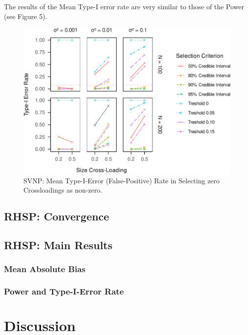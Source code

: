 \documentclass[
  man, donotrepeattitle,floatsintext]{apa6}
\begin{document}
The results of the Mean Type-I error rate are very similar to those of the Power (see Figure 5).

\begin{figure}
\centering
\includegraphics{JMBKoch_thesis_files/figure-latex/unnamed-chunk-5-1.pdf}
\caption{\label{fig:unnamed-chunk-5}SVNP: Mean Type-I-Error (False-Positive) Rate in Selecting zero Crossloadings as non-zero.}
\end{figure}

\hypertarget{rhsp-convergence}{%
\subsection{RHSP: Convergence}\label{rhsp-convergence}}

\hypertarget{rhsp-main-results}{%
\subsection{RHSP: Main Results}\label{rhsp-main-results}}

\hypertarget{mean-absolute-bias-2}{%
\subsubsection{Mean Absolute Bias}\label{mean-absolute-bias-2}}

\hypertarget{power-and-type-i-error-rate-2}{%
\subsubsection{Power and Type-I-Error Rate}\label{power-and-type-i-error-rate-2}}

\hypertarget{discussion}{%
\section{Discussion}\label{discussion}}
\end{document}
